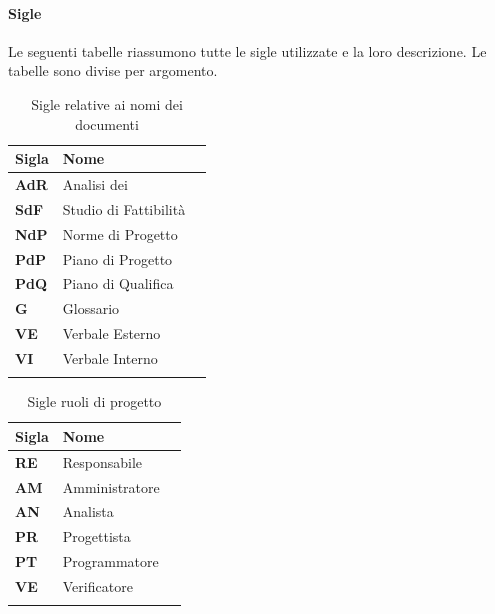 {{\paragraph*{Sigle}
Le seguenti tabelle riassumono tutte le sigle utilizzate e la loro descrizione. Le tabelle sono divise per argomento.
	\setlength{\freewidth}{\dimexpr\textwidth-1\tabcolsep}
	\renewcommand{\arraystretch}{1.5}
	\setlength{\aboverulesep}{0pt}
	\setlength{\belowrulesep}{0pt}
	\begin{longtable}{L{.1\freewidth} L{.25\freewidth} L{.080\freewidth}}
		\textbf{Sigla} & \textbf{Nome} \\
		\toprule
		\endhead		
		 \textbf{AdR}& Analisi dei  \\
		 \textbf{SdF} & Studio di Fattibilità \\
		 \textbf{NdP} & Norme di Progetto \\
		 \textbf{PdP} & Piano di Progetto \\
		 \textbf{PdQ} & Piano di Qualifica \\
		 \textbf{G} & Glossario \\
		 \textbf{VE} & Verbale Esterno \\
		 \textbf{VI} & Verbale Interno \\

		\bottomrule
		\hiderowcolors
		\caption{Sigle relative ai nomi dei documenti}
	\end{longtable}
	\newpage{}
	\setlength{\freewidth}{\dimexpr\textwidth-1\tabcolsep}
	\renewcommand{\arraystretch}{1.5}
	\setlength{\aboverulesep}{0pt}
	\setlength{\belowrulesep}{0pt}
	\begin{longtable}{L{.1\freewidth} L{.25\freewidth} L{.080\freewidth}}
		\textbf{Sigla} & \textbf{Nome} \\
		\toprule
		\endhead		
		 \textbf{RE}& Responsabile \\
		 \textbf{AM} & Amministratore \\
		 \textbf{AN} & Analista \\
		 \textbf{PR} & Progettista \\
		 \textbf{PT} & Programmatore \\
		 \textbf{VE} & Verificatore \\

		\bottomrule
		\hiderowcolors
		\caption{Sigle ruoli di progetto}
	\end{longtable}
		
}}
